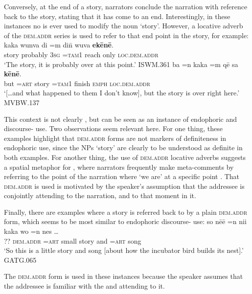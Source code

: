 \documentclass[output=paper
,modfonts
,nonflat]{langsci/langscibook}
\begin{document}
Conversely, at the end of a story, narrators conclude the narration with reference back to the story, stating that it has come to an end. Interestingly, in these instances no  is ever used to modify the noun `story'. However, a locative adverb of the \textsc{dem.addr} series is used to refer to that end point in the story, for example:
\ea	\label{ex38}
\gll	kaka	wunva	di		=m		di\=n	wuva	\textbf{ek\=en\=e}.		\\
story	probably	\textsc{3sg}	\textsc{=tam1}	reach	only		\textsc{loc.dem.addr}		\\
\glt	`The story, it is probably over at this point.'		\hfill{ISWM.361}
\z
\ea	\label{ex39}
\gll		ba		=n	kaka	=m		q\=e{\textquotesingle}	sa		\textbf{k\=en\=e}.		\\
but		\textsc{=art}		story	\textsc{=tam1}	finish	\textsc{emph}	\textsc{loc.dem.addr}		\\
\glt		`[\dots and what happened to them I don’t know], but the story is over right here.'\\\hfill{MVBW.137}
\z

\noindent
This context is not clearly , but can be seen as an instance of endophoric and discourse- use. Two observations seem relevant here. For one thing, these examples highlight that \textsc{dem.addr} forms are not markers of definiteness in endophoric use, since the NPs `story' are clearly to be understood as definite in both examples. For another thing, the use of \textsc{dem.addr} locative adverbs suggests a spatial metaphor for , where narrators frequently make meta-comments by referring to the point of the narration where `we are' at a specific point \citep[cf.][475]{Diessel2006}. That \textsc{dem.addr} is used is motivated by the speaker’s assumption that the addressee is conjointly attending to the narration, and to that moment in it.

Finally, there are examples where a story is referred back to by a plain \textsc{dem.addr} form, which seems to be most similar to endophoric discourse- use:
\ea	\label{ex40}
\gll so		n\=e{\textquotesingle}\=e		=n		ni{\textquotesingle}i	kaka		wo	=n		nes	{\ob}\dots{\cb}		\\
		??		\textsc{dem.addr}		\textsc{=art}	small	story		and	\textsc{=art}		song			\\
\glt	`So this is a little story and song [about how the incubator bird builds its nest].'\\\hfill{GATG.065}
\z

\noindent
The \textsc{dem.addr} form is used in these instances because the speaker assumes that the addressee is familiar with the  and attending to it.
\end{document}
